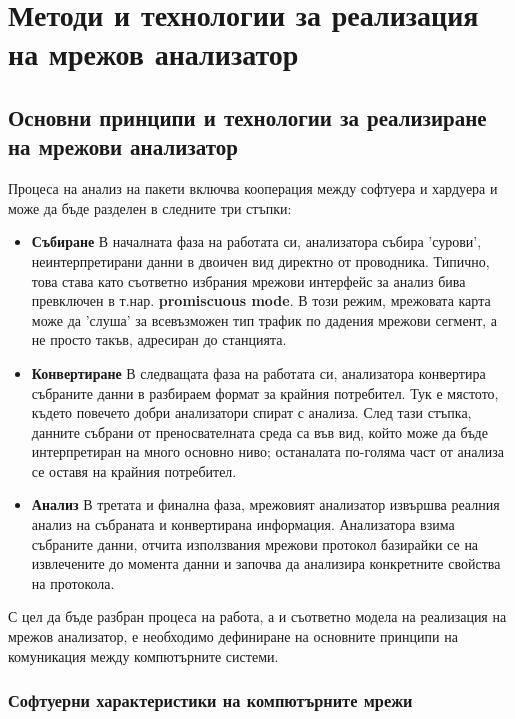 \documentclass[12pt,a4paper,oneside]{book}
\begin{document}
\justify
\chapter{Методи и технологии за реализация на мрежов анализатор}

\section{Основни принципи и технологии за реализиране на мрежови анализатор}
Процеса на анализ на пакети включва кооперация между софтуера и хардуера и може
да бъде разделен в следните три стъпки:

\begin{itemize}
  \item
    \textbf{Събиране} В началната фаза на работата си, анализатора събира
    'сурови', неинтерпретирани данни в двоичен вид директно от проводника.
    Типично, това става като съответно избрания мрежови интерфейс за анализ
    бива превключен в т.нар.  \textbf{promiscuous mode}. В този режим, мрежовата карта
    може да 'слуша' за всевъзможен тип трафик по дадения мрежови сегмент, а не
    просто такъв, адресиран до станцията.
  \item
    \textbf{Конвертиране} В следващата фаза на работата си, анализатора
    конвертира събраните данни в разбираем формат за крайния потребител. Тук е
    мястото, където повечето добри анализатори спират с анализа. След тази
    стъпка, данните събрани от преносвателната среда са във вид, който може да
    бъде интерпретиран на много основно ниво; останалата по-голяма част от
    анализа се оставя на крайния потребител.
  \item
    \textbf{Анализ} В третата и финална фаза, мрежовият анализатор извършва
    реалния анализ на събраната и конвертирана информация. Анализатора взима
    събраните данни, отчита използвания мрежови протокол базирайки се на
    извлечените до момента данни и започва да анализира конкретните свойства на
    протокола.
\end{itemize}

С цел да бъде разбран процеса на работа, а и съответно модела на реализация на
мрежов анализатор, е необходимо дефиниране на основните принципи на
комуникация между компютърните системи.

\subsection{Софтуерни характеристики на компютърните мрежи}
\end{document}
